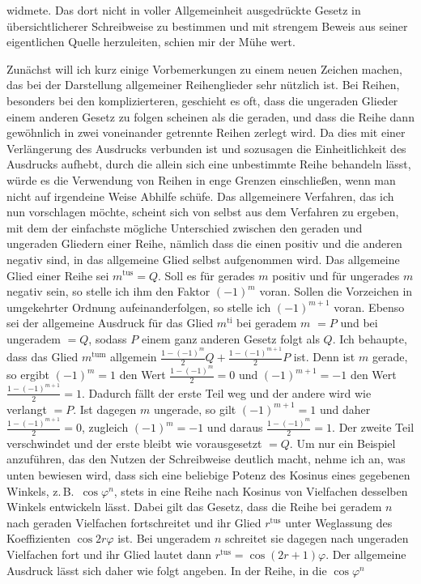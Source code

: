 widmete. Das dort nicht in voller Allgemeinheit ausgedrückte Gesetz in übersichtlicherer Schreibweise zu bestimmen und mit strengem Beweis aus seiner eigentlichen Quelle herzuleiten, schien mir der Mühe wert.

Zunächst will ich kurz einige Vorbemerkungen zu einem neuen Zeichen machen, das bei der Darstellung allgemeiner Reihenglieder sehr nützlich ist. Bei Reihen, besonders bei den komplizierteren, geschieht es oft, dass die ungeraden Glieder einem anderen Gesetz zu folgen scheinen als die geraden, und dass die Reihe dann gewöhnlich in zwei voneinander getrennte Reihen zerlegt wird. Da dies mit einer Verlängerung des Ausdrucks verbunden ist und sozusagen die Einheitlichkeit des Ausdrucks aufhebt, durch die allein sich eine unbestimmte Reihe behandeln lässt, würde es die Verwendung von Reihen in enge Grenzen einschließen, wenn man nicht auf irgendeine Weise Abhilfe schüfe. Das allgemeinere Verfahren, das ich nun vorschlagen möchte, scheint sich von selbst aus dem Verfahren zu ergeben, mit dem der einfachste mögliche Unterschied zwischen den geraden und ungeraden Gliedern einer Reihe, nämlich dass die einen positiv und die anderen negativ sind, in das allgemeine Glied selbst aufgenommen wird. Das allgemeine Glied einer Reihe sei $m^{\text{tus}} = Q$. Soll es für gerades $m$ positiv und für ungerades $m$ negativ sein, so stelle ich ihm den Faktor $(-1)^m$ voran. Sollen die Vorzeichen in umgekehrter Ordnung aufeinanderfolgen, so stelle ich $(-1)^{m+1}$ voran. Ebenso sei der allgemeine Ausdruck für das Glied $m^{\text{ti}}$ bei geradem $m$ $= P$ und bei ungeradem $= Q$, sodass $P$ einem ganz anderen Gesetz folgt als $Q$. Ich behaupte, dass das Glied $m^{\text{tum}}$ allgemein $\frac{1-(-1)^m}{2}Q+\frac{1-(-1)^{m+1}}{2}P$ ist. Denn ist $m$ gerade, so ergibt $(-1)^m=1$ den Wert $\frac{1-(-1)^m}{2}=0$ und $(-1)^{m+1}=-1$ den Wert $\frac{1-(-1)^{m+1}}{2}=1$. Dadurch fällt der erste Teil weg und der andere wird wie verlangt $=P$. Ist dagegen $m$ ungerade, so gilt $(-1)^{m+1}=1$ und daher $\frac{1-(-1)^{m+1}}{2}=0$, zugleich $(-1)^m=-1$ und daraus $\frac{1-(-1)^m}{2}=1$. Der zweite Teil verschwindet und der erste bleibt wie vorausgesetzt $=Q$. Um nur ein Beispiel anzuführen, das den Nutzen der Schreibweise deutlich macht, nehme ich an, was unten bewiesen wird, dass sich eine beliebige Potenz des Kosinus eines gegebenen Winkels, z.\,B.\ $\cos\varphi^n$, stets in eine Reihe nach Kosinus von Vielfachen desselben Winkels entwickeln lässt. Dabei gilt das Gesetz, dass die Reihe bei geradem $n$ nach geraden Vielfachen fortschreitet und ihr Glied $r^{\text{tus}}$ unter Weglassung des Koeffizienten $\cos 2r\varphi$ ist. Bei ungeradem $n$ schreitet sie dagegen nach ungeraden Vielfachen fort und ihr Glied lautet dann $r^{\text{tus}} = \cos(2r+1)\varphi$. Der allgemeine Ausdruck lässt sich daher wie folgt angeben. In der Reihe, in die $\cos\varphi^n$%
